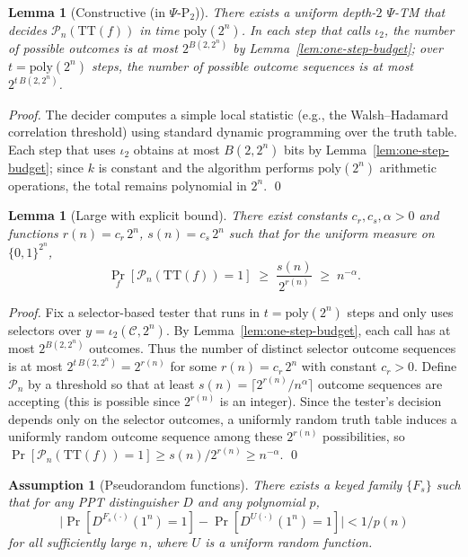 \documentclass[11pt]{article}
\newtheorem{lemma}[theorem]{Lemma}
\theoremstyle{plain}
\newtheorem{assumption}[theorem]{Assumption}
\theoremstyle{definition}
\newcommand{\PSi}{\Psi}
\begin{document}
\begin{lemma}[Constructive (in $\Psi$-P$_2$)]
There exists a uniform depth-$2$ $\PSi$-TM that decides $\mathcal{P}_n(\mathrm{TT}(f))$ in time $\mathrm{poly}(2^n)$. In each step that calls $\iota_2$, the number of possible outcomes is at most $2^{B(2,2^n)}$ by Lemma~\ref{lem:one-step-budget}; over $t=\mathrm{poly}(2^n)$ steps, the number of possible outcome sequences is at most $2^{t\,B(2,2^n)}$.
\end{lemma}
\begin{proof}
The decider computes a simple local statistic (e.g., the Walsh--Hadamard correlation threshold) using standard dynamic programming over the truth table. Each step that uses $\iota_2$ obtains at most $B(2,2^n)$ bits by Lemma~\ref{lem:one-step-budget}; since $k$ is constant and the algorithm performs $\mathrm{poly}(2^n)$ arithmetic operations, the total remains polynomial in $2^n$. \qed
\end{proof}

\begin{lemma}[Large with explicit bound]
There exist constants $c_r,c_s,\alpha>0$ and functions $r(n)=c_r\,2^n$, $s(n)=c_s\,2^n$ such that for the uniform measure on $\{0,1\}^{2^n}$,
\[
\Pr_{f}[\mathcal{P}_n(\mathrm{TT}(f))=1] \;\ge\; \frac{s(n)}{2^{r(n)}} \;\ge\; n^{-\alpha}.
\]
\end{lemma}
\begin{proof}
Fix a selector-based tester that runs in $t=\mathrm{poly}(2^n)$ steps and only uses selectors over $y=\iota_2(\mathcal{C},2^n)$. By Lemma~\ref{lem:one-step-budget}, each call has at most $2^{B(2,2^n)}$ outcomes. Thus the number of distinct selector outcome sequences is at most $2^{t\,B(2,2^n)}=2^{r(n)}$ for some $r(n)=c_r\,2^n$ with constant $c_r>0$. Define $\mathcal{P}_n$ by a threshold so that at least $s(n)=\lceil 2^{r(n)}/n^{\alpha}\rceil$ outcome sequences are accepting (this is possible since $2^{r(n)}$ is an integer). Since the tester’s decision depends only on the selector outcomes, a uniformly random truth table induces a uniformly random outcome sequence among these $2^{r(n)}$ possibilities, so
\(\Pr[\mathcal{P}_n(\mathrm{TT}(f))=1]\ge s(n)/2^{r(n)}\ge n^{-\alpha}.\)
\qed
\end{proof}

\begin{assumption}[Pseudorandom functions]
\label{asm:prf}
There exists a keyed family $\{F_s\}$ such that for any PPT distinguisher $D$ and any polynomial $p$, 
\[
\big|\Pr[D^{F_s(\cdot)}(1^n)=1]-\Pr[D^{U(\cdot)}(1^n)=1]\big|<1/p(n)
\]
for all sufficiently large $n$, where $U$ is a uniform random function.
\end{assumption}
\end{document}
